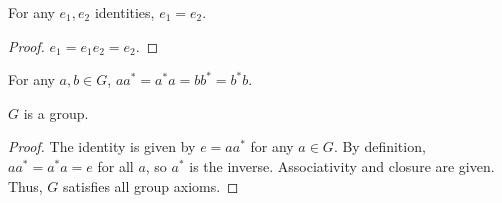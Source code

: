 \documentclass[11pt]{article}
\begin{document}
\begin{corollary}
    For any $e_{1},e_{2}$ identities, $e_{1}=e_{2}$.
\end{corollary}
\begin{proof}
    $e_{1} = e_{1}e_{2} = e_{2}$.
\end{proof}

\begin{corollary}
    For any $a,b \in G$, $aa^{*} = a^{*}a = bb^{*} = b^{*}b$.
\end{corollary}

\begin{prop}
    $G$ is a group.
\end{prop}
\begin{proof}
    The identity is given by $e = aa^{*}$ for any $a \in G$.
    By definition, $aa^{*} = a^{*}a = e$ for all $a$,
    so $a^{*}$ is the inverse.
    Associativity and closure are given.
    Thus, $G$ satisfies all group axioms.
\end{proof}
\end{document}
